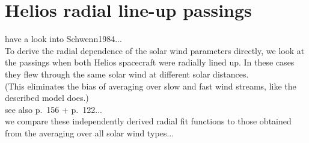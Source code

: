 \chapter{Helios radial line-up passings}


have a look into Schwenn1984...\\

To derive the radial dependence of the solar wind parameters directly, we look at the passings when both Helios spacecraft were radially lined up. In these cases they flew through the same solar wind at different solar distances.\\
(This eliminates the bias of averaging over slow and fast wind streams, like the described model does.)\\
see also \citet{Schwenn1990} p.~156 + p.~122...\\

we compare these independently derived radial fit functions to those obtained from the averaging over all solar wind types...\\

